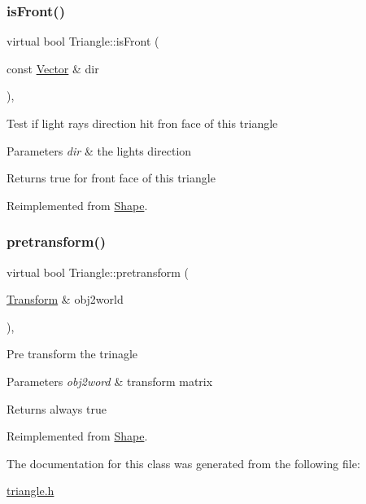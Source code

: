 \subsubsection{\texorpdfstring{is\+Front()}{isFront()}}
{\footnotesize\ttfamily virtual bool Triangle\+::is\+Front (\begin{DoxyParamCaption}\item[{const \mbox{\hyperlink{struct_vector}{Vector}} \&}]{dir }\end{DoxyParamCaption})\hspace{0.3cm}{\ttfamily [inline]}, {\ttfamily [virtual]}}

Test if light ray\textquotesingle{}s direction hit fron face of this triangle 
\begin{DoxyParams}{Parameters}
{\em dir} & the light\textquotesingle{}s direction \\
\hline
\end{DoxyParams}
\begin{DoxyReturn}{Returns}
true for front face of this triangle 
\end{DoxyReturn}


Reimplemented from \mbox{\hyperlink{class_shape_ac988eb692cfbfcaa1907491938a55b7a}{Shape}}.

\mbox{\label{class_triangle_a8fef25a36bfe124a5e632e4f9fe2726f}} 
\subsubsection{\texorpdfstring{pretransform()}{pretransform()}}
{\footnotesize\ttfamily virtual bool Triangle\+::pretransform (\begin{DoxyParamCaption}\item[{\mbox{\hyperlink{class_transform}{Transform}} \&}]{obj2world }\end{DoxyParamCaption})\hspace{0.3cm}{\ttfamily [inline]}, {\ttfamily [virtual]}}

Pre transform the trinagle 
\begin{DoxyParams}{Parameters}
{\em obj2word} & transform matrix \\
\hline
\end{DoxyParams}
\begin{DoxyReturn}{Returns}
always true 
\end{DoxyReturn}


Reimplemented from \mbox{\hyperlink{class_shape_ad4f344dbda0fb8446805631c0c408a16}{Shape}}.



The documentation for this class was generated from the following file\+:\begin{DoxyCompactItemize}
\item 
\mbox{\hyperlink{triangle_8h}{triangle.\+h}}\end{DoxyCompactItemize}
